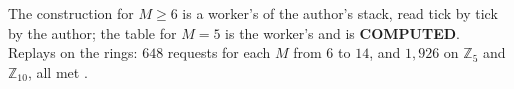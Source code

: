 The construction for $M\ge6$ is a worker's of the author's stack, read tick by tick by the author; the table for $M=5$ is the worker's and is \textbf{COMPUTED}. Replays on the rings: $648$ requests for each $M$ from $6$ to $14$, and $1{,}926$ on $\mathbb{Z}_5$ and $\mathbb{Z}_{10}$, all met \cite{comptp}.

